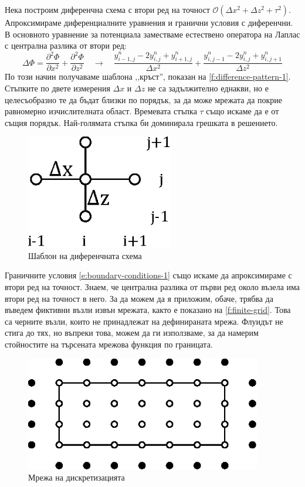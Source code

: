 \documentclass[12pt]{article}
\numberwithin{equation}{section}
\begin{document}
Нека построим диференчна схема с втори ред на точност $\mathcal{O}(\Delta x^2 + \Delta z^2 + \tau^2)$. Апроксимираме диференциалните уравнения и гранични условия с диференчни. В основното уравнение за потенциала заместваме естествено оператора на Лаплас с централна разлика от втори ред:
\begin{equation}
    \label{e:main-equation-finite-diff}
    \Delta \Phi = \frac{\partial^2 \Phi}{\partial x^2} + \frac{\partial^2 \Phi}{\partial z^2}
    \quad\rightarrow\quad
    \frac{y^n_{i-1,j} - 2y^n_{i,j} + y^n_{i+1,j}}{\Delta x^2} + \frac{y^n_{i,j-1} - 2y^n_{i,j} + y^n_{i,j+1}}{\Delta z^2}
\end{equation}
По този начин получаваме шаблона ,,кръст'', показан на \autoref{f:difference-pattern-1}. Стъпките по двете измерения $\Delta x$ и $\Delta z$ не са задължително еднакви, но е целесъобразно те да бъдат близки по порядък, за да може мрежата да покрие равномерно изчислителната област. Времевата стъпка $\tau$ също искаме да е от същия порядък. Най-голямата стъпка би доминирала грешката в решението.

\begin{figure}[H]
    \centering
    \includegraphics[height=5cm]{figures/pattern.eps}
    \caption{Шаблон на диференчната схема}
    \label{f:difference-pattern-1}
\end{figure}

Граничните условия \autoref{e:boundary-conditions-1} също искаме да апроксимираме с втори ред на точност. Знаем, че централна разлика от първи ред около възела има втори ред на точност в него. За да можем да я приложим, обаче, трябва да въведем фиктивни възли извън мрежата, както е показано на \autoref{f:finite-grid}. Това са черните възли, които не принадлежат на дефинираната мрежа. Флуидът не стига до тях, но въпреки това, можем да ги използваме, за да намерим стойностите на търсената мрежова функция по границата.

\begin{figure}[h]
    \centering
    \includegraphics[height=5cm]{figures/difference-scheme.eps}
    \caption{Мрежа на дискретизацията}
    \label{f:finite-grid}
\end{figure}
\end{document}
